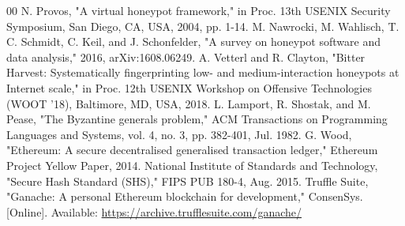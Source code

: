 \documentclass[conference]{IEEEtran}
\begin{document}
\begin{thebibliography}{00}
 N. Provos, "A virtual honeypot framework," in Proc. 13th USENIX Security Symposium, San Diego, CA, USA, 2004, pp. 1-14.
 M. Nawrocki, M. Wahlisch, T. C. Schmidt, C. Keil, and J. Schonfelder, "A survey on honeypot software and data analysis," 2016, arXiv:1608.06249.
 A. Vetterl and R. Clayton, "Bitter Harvest: Systematically fingerprinting low- and medium-interaction honeypots at Internet scale," in Proc. 12th USENIX Workshop on Offensive Technologies (WOOT '18), Baltimore, MD, USA, 2018.
 L. Lamport, R. Shostak, and M. Pease, "The Byzantine generals problem," ACM Transactions on Programming Languages and Systems, vol. 4, no. 3, pp. 382-401, Jul. 1982.
 G. Wood, "Ethereum: A secure decentralised generalised transaction ledger," Ethereum Project Yellow Paper, 2014.
 National Institute of Standards and Technology, "Secure Hash Standard (SHS)," FIPS PUB 180-4, Aug. 2015.
 Truffle Suite, "Ganache: A personal Ethereum blockchain for development," ConsenSys. [Online]. Available: \url{https://archive.trufflesuite.com/ganache/}
\end{thebibliography}
\end{document}
